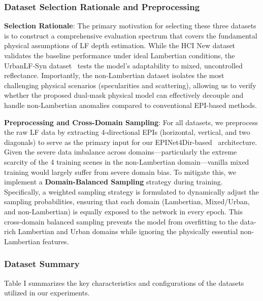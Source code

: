 \documentclass[lettersize,journal]{IEEEtran}
\begin{document}
\subsubsection{Dataset Selection Rationale and Preprocessing}
\textbf{Selection Rationale}: The primary motivation for selecting these three datasets is to construct a comprehensive evaluation spectrum that covers the fundamental physical assumptions of LF depth estimation. While the HCI New dataset~\cite{heber2018} validates the baseline performance under ideal Lambertian conditions, the UrbanLF-Syn dataset~\cite{honauer2016} tests the model's adaptability to mixed, uncontrolled reflectance. Importantly, the non-Lambertian dataset isolates the most challenging physical scenarios (specularities and scattering), allowing us to verify whether the proposed dual-mask physical model can effectively decouple and handle non-Lambertian anomalies compared to conventional EPI-based methods.

\textbf{Preprocessing and Cross-Domain Sampling}: 
For all datasets, we preprocess the raw LF data by extracting 4-directional EPIs (horizontal, vertical, and two diagonals) to serve as the primary input for our EPINet4Dir-based~\cite{vaswani2017} architecture. Given the severe data imbalance across domains---particularly the extreme scarcity of the 4 training scenes in the non-Lambertian domain---vanilla mixed training would largely suffer from severe domain bias. To mitigate this, we implement a \textbf{Domain-Balanced Sampling} strategy during training. Specifically, a weighted sampling strategy is formulated to dynamically adjust the sampling probabilities, ensuring that each domain (Lambertian, Mixed/Urban, and non-Lambertian) is equally exposed to the network in every epoch. This cross-domain balanced sampling prevents the model from overfitting to the data-rich Lambertian and Urban domains while ignoring the physically essential non-Lambertian features.

\subsubsection{Dataset Summary}
Table I summarizes the key characteristics and configurations of the datasets utilized in our experiments.
\end{document}
